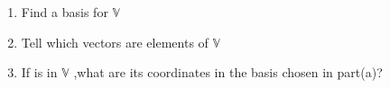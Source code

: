 \begin{enumerate}[label=\thesubsection.\arabic*.,ref=\thesubsection.\theenumi]
\begin{enumerate}[label=\alph*.]
\item Find a basis for $\mathbb{V}$
\item Tell which vectors  are elements of $\mathbb{V}$ 
\item If  is in $\mathbb{V}$ ,what are its coordinates in the basis chosen in part(a)?
\end{enumerate}
%
\solution


\end{enumerate}
